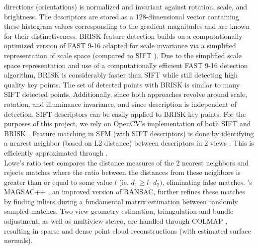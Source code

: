 \documentclass[conference,compsoc]{IEEEtran}
\begin{document}
directions (orientations) is normalized and invariant against rotation, 
scale, and brightness. The descriptors are stored as a 128-dimensional 
vector containing these histogram values corresponding to the gradient 
magnitudes and are known for their distinctiveness. BRISK feature detection
\cite{brisk} builds on a computationally optimized version of 
FAST 9-16 adapted for scale invariance via a simplified representation of 
scale space (compared to SIFT \cite{sift}). Due to the simplified scale 
space representation and use of a computationally efficient FAST 9-16 
detection algorithm, BRISK is considerably faster than SIFT while still 
detecting high quality key points. The set of detected points with BRISK is 
similar to many SIFT detected points. Additionally, since both approaches 
revolve around scale, rotation, and illuminance invariance, and since description 
is independent of detection, SIFT descriptors can be easily applied to BRISK key 
points. For the purposes of this project, we rely on OpenCV's 
implementation of both SIFT \cite{siftcv} and BRISK \cite{briskcv}.
Feature matching in SFM (with SIFT descriptors) is done by identifying 
a nearest neighbor (based on L2 distance) between descriptors in 2 views \cite{sift}.
This is efficiently approximated through \cite{fnn}.\\
Lowe's ratio test \cite{sift} compares the distance measures of 
the 2 nearest neighbors and rejects matches where the ratio between the 
distances from these neighbors is greater than or equal to some value $l$ (ie.
$d_1 \ge l \cdot d_2)$, eliminating false matches. \cite{usac}'s 
MAGSAC++ \cite{magsac}, an improved version of RANSAC, further 
refines these matches by finding inliers during a fundamental 
matrix estimation between randomly sampled matches. 
Two view geometry estimation, triangulation and bundle adjustment, 
as well as multiview stereo, are handled through COLMAP \cite{colmap}
\cite{schoenberger2016sfm} \cite{schoenberger2016mvs}, resulting in sparse 
and dense point cloud reconstructions (with estimated surface normals).

\end{document}
